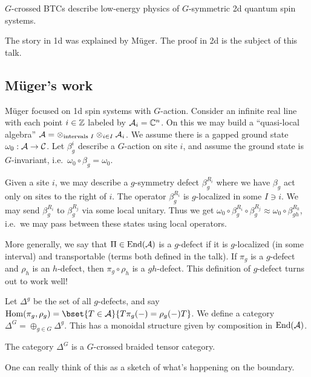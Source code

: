 \documentclass{amsart}
\begin{document}
\begin{conj}
  $G$-crossed BTCs describe low-energy physics of $G$-symmetric 2d quantum spin systems.
\end{conj}

The story in 1d was explained by M\"uger.
The proof in 2d is the subject of this talk.

\subsection{M\"uger's work}

M\"uger focused on 1d spin systems with $G$-action.
Consider an infinite real line with each point $i \in \mathbb{Z}$ labeled by $\mathcal{A}_i = \mathbb{C}^n$.
On this we may build a ``quasi-local algebra'' $\mathcal{A} = \otimes_{\textrm{intervals } I} \otimes_{i \in I} \mathcal{A}_i$.
We assume there is a gapped ground state $\omega_0: \mathcal{A} \to \mathcal{C}$.
Let $\beta^i_g$ describe a $G$-action on site $i$, and assume the ground state is $G$-invariant, i.e.\ $\omega_0 \circ \beta_g = \omega_0$.

Given a site $i$, we may describe a $g$-symmetry defect $\beta_g^{R_i}$ where we have $\beta_g$ act only on sites to the right of $i$.
The operator $\beta_g^{R_i}$ is $g$-localized in some $I \ni i$.
We may send $\beta_g^{R_i}$ to $\beta_g^{R_j}$ via some local unitary.
Thus we get $\omega_0 \circ \beta_g^{R_i} \circ \beta_g^{R_j} \approx \omega_0 \circ \beta_{gh}^{R_k}$, i.e.\ we may pass between these states using local operators.

More generally, we say that $\Pi \in \operatorname{End}(\mathcal{A})$ is a $g$-defect if it is $g$-localized (in some interval) and transportable (terms both defined in the talk).
If $\pi_g$ is a $g$-defect and $\rho_h$ is an $h$-defect, then $\pi_g \circ \rho_h$ is a $gh$-defect.
This definition of $g$-defect turns out to work well!

Let $\Delta^g$ be the set of all $g$-defects, and say $\Hom(\pi_g, \rho_g) = \bset{T \in \Ac}{T \pi_g(-) = \rho_g(-) T}$.
We define a category $\Delta^G = \oplus_{g \in G} \Delta^g$.
This has a monoidal structure given by composition in $\operatorname{End}(\mathcal{A})$.

\begin{thm}[M\"uger]
  The category $\Delta^G$ is a $G$-crossed braided tensor category.
\end{thm}

\begin{rmk}
  One can really think of this as a sketch of what's happening on the boundary.
\end{rmk}
\end{document}
